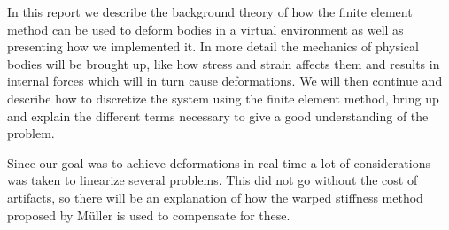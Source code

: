 In this report we describe the background theory of how the finite element method can be used to deform bodies in a virtual environment as well as presenting how we implemented it. In more detail the mechanics of physical bodies will be brought up, like how stress and strain affects them and results in internal forces which will in turn cause deformations. We will then continue and describe how to discretize the system using the finite element method, bring up and explain the different terms necessary to give a good understanding of the problem. 

Since our goal was to achieve deformations in real time a lot of considerations was taken to linearize several problems. This did not go without the cost of artifacts, so there will be an explanation of how the warped stiffness method proposed by M\"uller is used to compensate for these.